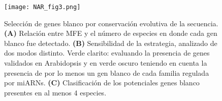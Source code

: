 \begin{figure}[htbp!] 
    \centering    
    \texttt{[image: NAR\_fig3.png]}
    \caption[Selección de genes blanco por conservación evolutiva de la secuencia]{Selección de genes blanco por conservación evolutiva de la secuencia.
    \textbf{(A)} Relación entre MFE y el número de especies en donde cada gen blanco fue detectado.
    \textbf{(B)} Sensibilidad de la estrategia, analizado de dos modos distinto. 
    Verde clarito: evaluando la presencia de genes validados en Arabidopsis y en verde oscuro teniendo en cuenta la presencia de por lo menos un gen blanco de cada familia regulada por miARNs.
    \textbf{(C)} Clasificación de los potenciales genes blanco presentes en al menos 4 especies.}
    \label{fig:NAR_fig3}
\end{figure}




